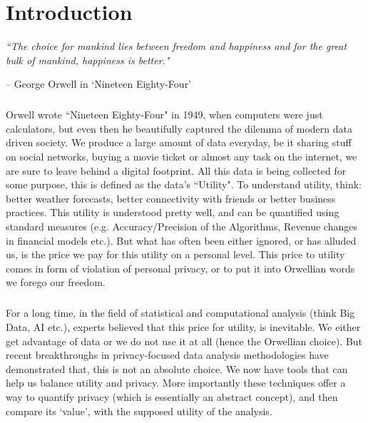 \documentclass[12pt]{report}
\theoremstyle{named}
\begin{document}
\listoffigures
 
\listoftables
 
\newpage

\chapter{Introduction}


\textit{``The choice for mankind lies between freedom and happiness and for the great bulk of mankind, happiness is better."}

{\raggedleft -- George Orwell in `Nineteen Eighty-Four'\quad\par}

\paragraph{}
Orwell wrote ``Nineteen Eighty-Four" in 1949, when computers were just calculators, but even then he beautifully captured the dilemma of modern data driven society. We produce a large amount of data everyday, be it sharing stuff on social networks, buying a movie ticket or almost any task on the internet, we are sure to leave behind a digital footprint. All this data is being collected for some purpose, this is defined as the data's ``Utility". To understand utility, think: better weather forecasts, better connectivity with friends or better business practices. This utility is understood pretty well, and can be quantified using standard measures (e.g. Accuracy/Precision of the Algorithms, Revenue changes in financial models etc.). But what has often been either ignored, or has alluded us, is the price we pay for this utility on a personal level. This price to utility comes in form of violation of personal privacy, or to put it into Orwellian words we forego our freedom.
\paragraph{}
For a long time, in the field of statistical and computational analysis (think Big Data, AI etc.), experts believed that this price for utility, is inevitable. We either get advantage of data or we do not use it at all (hence the Orwellian choice). But recent breakthroughs in privacy-focused data analysis methodologies have demonstrated that, this is not an absolute choice. We now have tools that can help us balance utility and privacy. More importantly these techniques offer a way to quantify privacy (which is essentially an abstract concept), and then compare its `value', with the supposed utility of the analysis.
\end{document}
